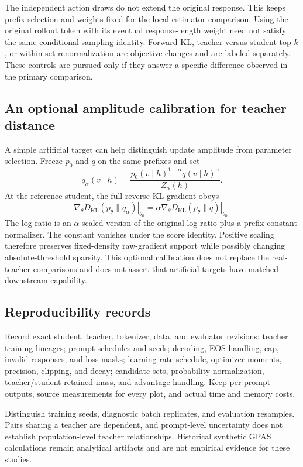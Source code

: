 The independent action draws do not extend the original response.
This keeps prefix selection and weights fixed for the local estimator
comparison. Using the original rollout token with its eventual
response-length weight need not satisfy the same conditional sampling
identity. Forward KL, teacher versus student top-$k$, or within-set
renormalization are objective changes and are labeled separately.
These controls are pursued only if they answer a specific difference
observed in the primary comparison.

\subsection{An optional amplitude calibration for teacher distance}
\label{app:teacher_controls}

A simple artificial target can help distinguish update amplitude from
parameter selection. Freeze $p_0$ and $q$ on the same prefixes and set
\begin{equation}
q_\alpha(v\mid h)=
\frac{p_0(v\mid h)^{1-\alpha}q(v\mid h)^\alpha}{Z_\alpha(h)}.
\label{eq:tilt_teacher}
\end{equation}
At the reference student, the full reverse-KL gradient obeys
\begin{equation}
\left.\nabla_\theta D_{\mathrm{KL}}(p_\theta\|q_\alpha)
\right|_{\theta_0}
=\alpha\left.\nabla_\theta D_{\mathrm{KL}}(p_\theta\|q)
\right|_{\theta_0}.
\label{eq:tilt_gradient}
\end{equation}
The log-ratio is an $\alpha$-scaled version of the original log-ratio
plus a prefix-constant normalizer. The constant vanishes under the
score identity. Positive scaling therefore preserves fixed-density
raw-gradient support while
possibly changing absolute-threshold sparsity. This optional
calibration does not replace the real-teacher comparisons and does
not assert that artificial targets have matched downstream capability.

\subsection{Reproducibility records}

Record exact student, teacher, tokenizer, data, and evaluator revisions;
teacher training lineages; prompt schedules and seeds; decoding,
EOS handling, cap, invalid responses, and loss masks; learning-rate
schedule, optimizer moments, precision, clipping, and decay; candidate
sets, probability normalization, teacher/student retained mass, and
advantage handling. Keep per-prompt outputs, source measurements for
every plot, and actual time and memory costs.

Distinguish training seeds, diagnostic batch replicates, and evaluation
resamples. Pairs sharing a teacher are dependent, and prompt-level
uncertainty does not establish population-level teacher relationships.
Historical synthetic GPAS calculations remain analytical artifacts and
are not empirical evidence for these studies.
